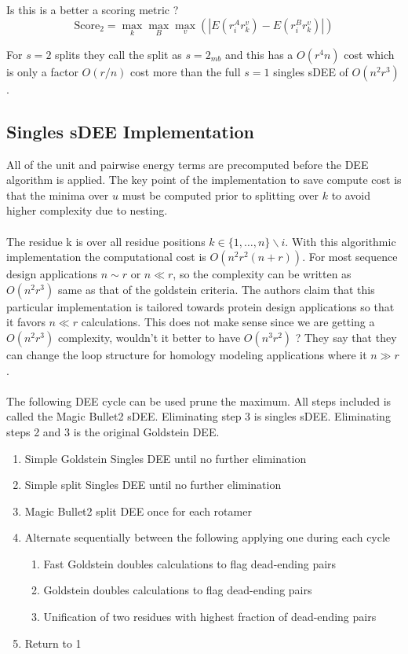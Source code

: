 \documentclass{article}
\begin{document}
Is this is a better a scoring metric ? 
\[
\text{Score}_2 = \max_k \max_B \max_v \left( \left| E(r_i^Ar_k^v) - E(r_i^Br_k^v) \right| \right)
\]

For $s=2$ splits they call the split as $s=2_{mb}$ and this has a $O(r^4n)$ cost which is only a factor $O(r/n)$ cost more than the full $s=1$ singles sDEE of $O(n^2r^3)$. 

\subsection{Singles sDEE Implementation}

All of the unit and pairwise energy terms are precomputed before the DEE algorithm is applied. The key point of the implementation to save compute cost is that the minima over $u$ must be computed prior to splitting over $k$ to avoid higher complexity due to nesting. 
\\
\\
The residue k is over all residue positions $k \in \{1,\dots, n\}\backslash i$. With this algorithmic implementation the computational cost is $O(n^2r^2(n+r))$. For most sequence design applications $n \sim r$ or $n\ll r$, so the complexity can be written as $O(n^2r^3)$ same as that of the goldstein criteria. The authors claim that this particular implementation is tailored towards protein design applications so that it favors $n \ll r$ calculations. This does not make sense since we are getting a $O(n^2r^3)$ complexity, wouldn't it better to have $O(n^3r^2)$ ? They say that they can change the loop structure for homology modeling applications where it $n \gg r$. 
\\
\\
The following DEE cycle can be used prune the maximum. All steps included is called the Magic Bullet2 sDEE. Eliminating step 3 is singles sDEE. Eliminating steps 2 and 3 is the original Goldstein DEE. 
\begin{enumerate}
\item Simple Goldstein Singles DEE until no further elimination
\item Simple split Singles DEE until no further elimination
\item Magic Bullet2 split DEE once for each rotamer
\item Alternate sequentially between the following applying one during each cycle
\begin{enumerate}
\item  Fast Goldstein doubles calculations to flag dead-ending pairs
\item Goldstein doubles calculations to flag dead-ending pairs
\item Unification of two residues with highest fraction of dead-ending pairs
\end{enumerate}
\item Return to 1
\end{enumerate}
\end{document}
